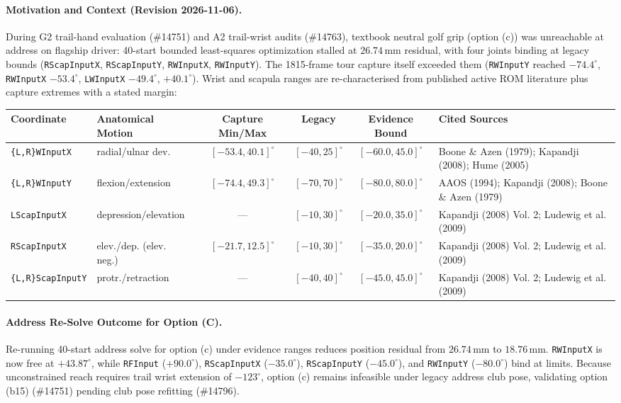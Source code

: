 \documentclass[11pt,a4paper]{article}
\begin{document}
\paragraph{Motivation and Context (Revision 2026-11-06).}
During G2 trail-hand evaluation (\#14751) and A2 trail-wrist audits (\#14763), textbook neutral golf grip (option (c)) was unreachable at address on flagship driver: 40-start bounded least-squares optimization stalled at $26.74$\,mm residual, with four joints binding at legacy bounds (\texttt{RScapInputX}, \texttt{RScapInputY}, \texttt{RWInputX}, \texttt{RWInputY}). The 1815-frame tour capture itself exceeded them (\texttt{RWInputY} reached $-74.4^{\circ}$, \texttt{RWInputX} $-53.4^{\circ}$, \texttt{LWInputX} $-49.4^{\circ}$, $+40.1^{\circ}$). Wrist and scapula ranges are re-characterised from published active ROM literature plus capture extremes with a stated margin:
\begin{center}\small
\begin{tabular}{@{}llcccl@{}}
\toprule
Coordinate & Anatomical Motion & Capture Min/Max & Legacy & Evidence Bound & Cited Sources \\
\midrule
\texttt{\{L,R\}WInputX} & radial/ulnar dev. & $[-53.4, 40.1]^{\circ}$ & $[-40, 25]^{\circ}$ & $[-60.0, 45.0]^{\circ}$ & Boone \& Azen (1979); Kapandji (2008); Hume (2005) \\
\texttt{\{L,R\}WInputY} & flexion/extension & $[-74.4, 49.3]^{\circ}$ & $[-70, 70]^{\circ}$ & $[-80.0, 80.0]^{\circ}$ & AAOS (1994); Kapandji (2008); Boone \& Azen (1979) \\
\texttt{LScapInputX} & depression/elevation & --- & $[-10, 30]^{\circ}$ & $[-20.0, 35.0]^{\circ}$ & Kapandji (2008) Vol. 2; Ludewig et al. (2009) \\
\texttt{RScapInputX} & elev./dep. (elev. neg.) & $[-21.7, 12.5]^{\circ}$ & $[-10, 30]^{\circ}$ & $[-35.0, 20.0]^{\circ}$ & Kapandji (2008) Vol. 2; Ludewig et al. (2009) \\
\texttt{\{L,R\}ScapInputY} & protr./retraction & --- & $[-40, 40]^{\circ}$ & $[-45.0, 45.0]^{\circ}$ & Kapandji (2008) Vol. 2; Ludewig et al. (2009) \\
\bottomrule
\end{tabular}
\end{center}
\paragraph{Address Re-Solve Outcome for Option (C).}
Re-running 40-start address solve for option (c) under evidence ranges reduces position residual from $26.74$\,mm to $18.76$\,mm. \texttt{RWInputX} is now free at $+43.87^{\circ}$, while \texttt{RFInput} ($+90.0^{\circ}$), \texttt{RScapInputX} ($-35.0^{\circ}$), \texttt{RScapInputY} ($-45.0^{\circ}$), and \texttt{RWInputY} ($-80.0^{\circ}$) bind at limits. Because unconstrained reach requires trail wrist extension of $-123^{\circ}$, option (c) remains infeasible under legacy address club pose, validating option (b15) (\#14751) pending club pose refitting (\#14796).
\end{document}
